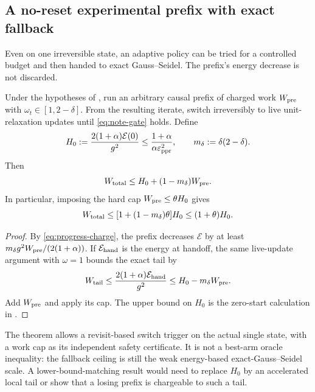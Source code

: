 \subsection{A no-reset experimental prefix with exact fallback}

Even on one irreversible state, an adaptive policy can be tried for a
controlled budget and then handed to exact Gauss--Seidel.  The prefix's
energy decrease is not discarded.

\begin{theorem}
\label{thm:budgeted-prefix}
Under the hypotheses of , run an arbitrary causal
prefix of charged work $W_{\rm pre}$ with
$\omega_t\in[1,2-\delta]$.  From the resulting iterate, switch irreversibly
to live unit-relaxation updates until \eqref{eq:note-gate} holds.  Define
\begin{equation}
 H_0:=\frac{2(1+\alpha)\mathcal E(0)}{g^2}
 \leq\frac{1+\alpha}{\alpha\varepsilon_{\mathrm{ppr}}^2},
 \qquad m_\delta:=\delta(2-\delta).
 \label{eq:fallback-budget}
\end{equation}
Then
\begin{equation}
 W_{\rm total}
 \leq H_0+(1-m_\delta)W_{\rm pre}.
 \label{eq:fallback-total}
\end{equation}
In particular, imposing the hard cap $W_{\rm pre}\leq\theta H_0$ gives
\begin{equation}
 W_{\rm total}
 \leq[1+(1-m_\delta)\theta]H_0
 \leq(1+\theta)H_0.
 \label{eq:fallback-cap}
\end{equation}
\end{theorem}

\begin{proof}
By \eqref{eq:progress-charge}, the prefix decreases $\mathcal E$ by at
least $m_\delta g^2W_{\rm pre}/(2(1+\alpha))$.  If
$\mathcal E_{\rm hand}$ is the energy at handoff, the same live-update
argument with $\omega=1$ bounds the exact tail by
\[
 W_{\rm tail}
 \leq\frac{2(1+\alpha)\mathcal E_{\rm hand}}{g^2}
 \leq H_0-m_\delta W_{\rm pre}.
\]
Add $W_{\rm pre}$ and apply its cap.  The upper bound on $H_0$ is the
zero-start calculation in .
\end{proof}

The theorem allows a revisit-based switch trigger on the actual single
state, with a work cap as its independent safety certificate.  It is not a
best-arm oracle inequality: the fallback ceiling is still the weak
energy-based exact-Gauss--Seidel scale.  A lower-bound-matching result would
need to replace $H_0$ by an accelerated local tail or show that a losing
prefix is chargeable to such a tail.
